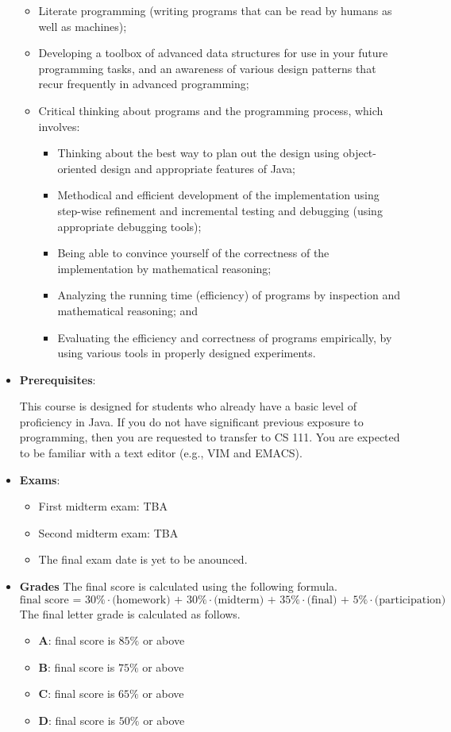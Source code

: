 \documentclass[11pt]{article}
\begin{document}
\begin{itemize}
\begin{itemize}
\item
Literate programming (writing programs that can be read by humans as well
as machines);

\item
Developing a toolbox of advanced data structures for use in your future
programming tasks, and an awareness of various design patterns that recur
frequently in advanced programming;

\item
Critical thinking about programs and the programming process, which
involves:
\begin{itemize}
\item
Thinking about the best way to plan out the design using object-oriented
design and appropriate features of Java;
\item
Methodical and efficient development of the implementation using step-wise
refinement and incremental testing and debugging (using appropriate
debugging tools);
\item
Being able to convince yourself of the correctness of the implementation by
mathematical reasoning;
\item
Analyzing the running time (efficiency) of programs by inspection and
mathematical reasoning; and
\item
Evaluating the efficiency and correctness of programs empirically, by using
various tools in properly designed experiments.
\end{itemize}
\end{itemize}

\item {\bf Prerequisites}:

This course is designed for students who already have a basic level of
proficiency in Java. If you do not have significant previous exposure
to programming, then you are requested to transfer to CS 111.  You are
expected to be familiar with a text editor (e.g., VIM and EMACS).

\item {\bf Exams}:
\begin{itemize}
\item
First midterm exam: TBA
\item
Second midterm exam: TBA
\item
The final exam date is yet to be anounced.
\end{itemize}

\item {\bf Grades}
The final score is calculated using the following formula.
\[\mbox{final score = 30\%$\cdot$(homework) + 30\%$\cdot$(midterm) + 35\%$\cdot$(final) + 5\%$\cdot$(participation)}\]
The final letter grade is calculated as follows.
\begin{itemize}
\item{\bf A}: final score is $85\%$ or above
\item{\bf B}: final score is $75\%$ or above
\item{\bf C}: final score is $65\%$ or above
\item{\bf D}: final score is $50\%$ or above
\end{itemize}


\end{itemize}
\end{document}
